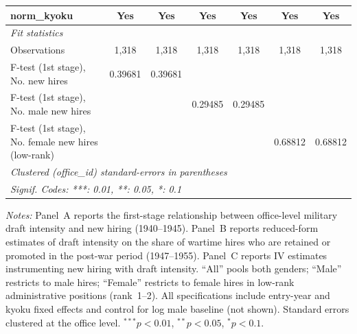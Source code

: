 \begin{table}[htbp]
\begin{threeparttable}
\begin{tabular}{lcccccc}
   norm\_kyoku                                         & Yes                     & Yes                      & Yes                      & Yes                       & Yes                        & Yes\\  
   \midrule
   \emph{Fit statistics}\\
   Observations                                        & 1,318                   & 1,318                    & 1,318                    & 1,318                     & 1,318                      & 1,318\\  
   F-test (1st stage), No. new hires                   & 0.39681                 & 0.39681                  &                          &                           &                            & \\  
   F-test (1st stage), No. male new hires              &                         &                          & 0.29485                  & 0.29485                   &                            & \\  
   F-test (1st stage), No. female new hires (low-rank) &                         &                          &                          &                           & 0.68812                    & 0.68812\\  
   \midrule \midrule
   \multicolumn{7}{l}{\emph{Clustered (office\_id) standard-errors in parentheses}}\\
   \multicolumn{7}{l}{\emph{Signif. Codes: ***: 0.01, **: 0.05, *: 0.1}}\\
\end{tabular}

\begin{tablenotes}[flushleft]
\footnotesize
\item \textit{Notes:} Panel~A reports the first-stage relationship between office-level military draft intensity and new hiring (1940--1945). Panel~B reports reduced-form estimates of draft intensity on the share of wartime hires who are retained or promoted in the post-war period (1947--1955). Panel~C reports IV estimates instrumenting new hiring with draft intensity. ``All'' pools both genders; ``Male'' restricts to male hires; ``Female'' restricts to female hires in low-rank administrative positions (rank~1--2). All specifications include entry-year and kyoku fixed effects and control for log male baseline (not shown). Standard errors clustered at the office level. $^{***}p<0.01$, $^{**}p<0.05$, $^{*}p<0.1$.
\end{tablenotes}
\end{threeparttable}
\end{table}
